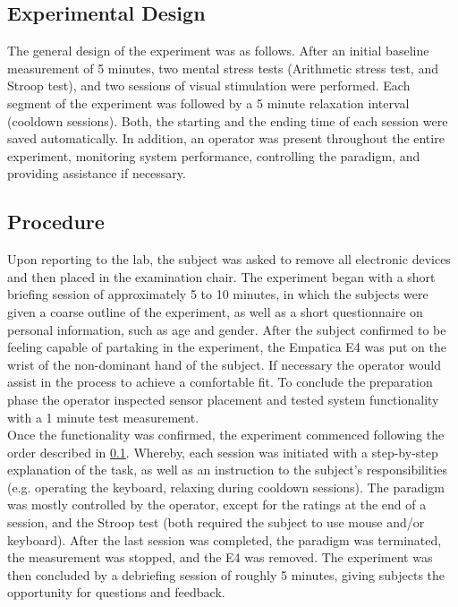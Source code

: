 \subsection{Experimental Design}\label{expdes}
The general design of the experiment was as follows.
After an initial baseline measurement of 5 minutes, two mental stress tests (Arithmetic stress test, and Stroop test), and two sessions of visual stimulation were performed. Each segment of the experiment was followed by a 5 minute relaxation interval (cooldown sessions). Both, the starting and the ending time of each session were saved automatically. In addition, an operator was present throughout the entire experiment, monitoring system performance, controlling the paradigm, and providing assistance if necessary.
\newpage
\subsection{Procedure}
Upon reporting to the lab, the subject was asked to remove all electronic devices and then placed in the examination chair. The experiment began with a short briefing session of approximately 5 to 10 minutes, in which the subjects were given a coarse outline of the experiment, as well as a short questionnaire on personal information, such as age and gender. After the subject confirmed to be feeling capable of partaking in the experiment, the Empatica E4 was put on the wrist of the non-dominant hand of the subject. If necessary the operator would assist in the process to achieve a comfortable fit. To conclude the preparation phase the operator inspected sensor placement and tested system functionality with a 1 minute test measurement.\\
Once the functionality was confirmed, the experiment commenced following the order described in \ref{expdes}. Whereby, each session was initiated with a step-by-step explanation of the task, as well as an instruction to the subject's responsibilities (e.g. operating the keyboard, relaxing during cooldown sessions). The paradigm was mostly controlled by the operator, except for the ratings at the end of a session, and the Stroop test (both required the subject to use mouse and/or keyboard).
After the last session was completed, the paradigm was terminated, the measurement was stopped, and the E4 was removed.
The experiment was then concluded by a debriefing session of roughly 5 minutes, giving subjects the opportunity for questions and feedback.

